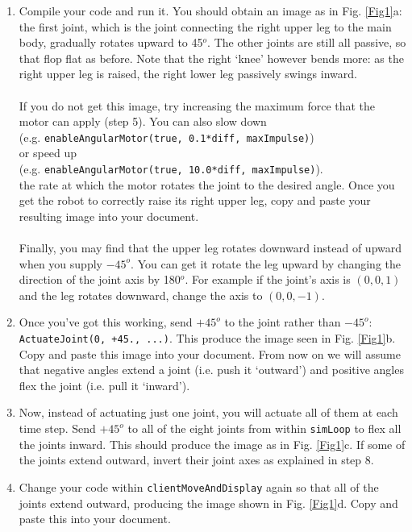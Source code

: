 \documentclass[12pt]{article}
\begin{document}
\begin{enumerate}
\item Compile your code and run it. You should obtain an image as in Fig. \ref{Fig1}a: the first joint, which is the joint connecting the right upper leg to the main body, gradually rotates upward to 45$^o$. The other joints are still all passive, so that flop flat as before. Note that the right `knee' however bends more: as the right upper leg is raised, the right lower leg passively swings inward. \\ \\
    If you do not get this image, try increasing the maximum force that the motor can apply (step 5). You can also slow down \\
    (e.g. \texttt{enableAngularMotor(true, 0.1*diff, maxImpulse)}) \\
    or speed up \\
    (e.g. \texttt{enableAngularMotor(true, 10.0*diff, maxImpulse)}). \\
    the rate at which the motor rotates the joint to the desired angle. Once you get the robot to correctly raise its right upper leg, copy and paste your resulting image into your document. \\ \\
    Finally, you may find that the upper leg rotates downward instead of upward when you supply $-45^o$. You can get it rotate the leg upward by changing the direction of the joint axis by 180$^o$. For example if the joint's axis is $(0,0,1)$ and the leg rotates downward, change the axis to $(0,0,-1)$.

\item Once you've got this working, send $+45^o$ to the joint rather than $-45^o$: \\
    \texttt{ActuateJoint(0, +45., ...)}. This produce the image seen in Fig. \ref{Fig1}b. Copy and paste this image into your document. From now on we will assume that negative angles extend a joint (i.e. push it `outward') and positive angles flex the joint (i.e. pull it `inward').

\item Now, instead of actuating just one joint, you will actuate all of them at each time step. Send $+45^o$ to all of the eight joints from within \texttt{simLoop} to flex all the joints inward. This should produce the image as in Fig. \ref{Fig1}c. If some of the joints extend outward, invert their joint axes as explained in step 8.

\item Change your code within \texttt{clientMoveAndDisplay} again so that all of the joints extend outward, producing the image shown in Fig. \ref{Fig1}d. Copy and paste this into your document.


\end{enumerate}
\end{document}
